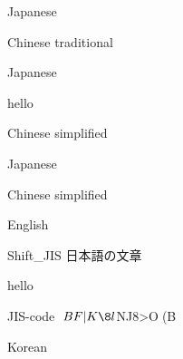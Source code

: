 \documentclass[english]{article}
\begin{document}
 
\begin{CJK}{EUC-JP}{}%
Japanese \end{CJK} \begin{CJK}{UTF8}{}Chinese traditional\end{CJK} \begin{CJK}{EUC-JP}{}
Japanese \end{CJK}
hello
\begin{CJK}{GB}{}%
Chinese simplified \end{CJK}\begin{CJK}{EUC-JP}{hei} Japanese \end{CJK} \begin{CJK}{GB}{}Chinese simplified
\end{CJK}

%
%
English

\begin{CJK}{SJIS}{}
Shift_JIS 日本語の文章
\end{CJK}

hello

\begin{CJK}{JIS}{}
JIS-code $BF|K\8l$NJ8>O(B
\end{CJK}

\begin{CJK}{KS}{}%
Korean
\end{CJK}
\end{document}
